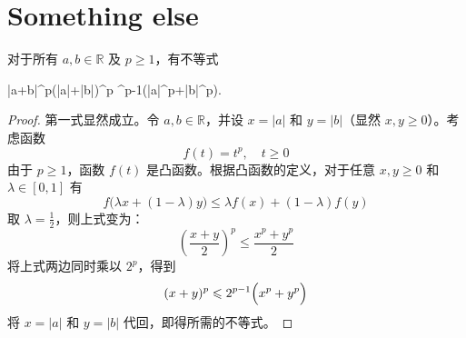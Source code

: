 \section{Something else}

\begin{theorem}
	对于所有 $a,b\in\mathbb{R}$ 及 $p\ge 1$，有不等式
	\begin{inequality*}\label{ineq:else-1}
		|a+b|^p\leqslant\Bigl(|a|+|b|\Bigr)^p ^{p-1}\Bigl(|a|^p+|b|^p\Bigr).
	\end{inequality*}
\end{theorem}
\begin{proof}
	第一式显然成立。令 $a,b\in\mathbb{R}$，并设 $x=|a|$ 和 $y=|b|$（显然 $x,y\geqslant0$）。考虑函数
	\begin{equation*}
		f(t)=t^p,\quad t\ge 0
	\end{equation*}
	由于 $p\geqslant1$，函数 $f(t)$ 是凸函数。根据凸函数的定义，对于任意 $x,y\ge 0$ 和 $\lambda\in[0,1]$ 有
	\begin{equation*}
		f\bigl(\lambda x+(1-\lambda)y\bigr)\leqslant\lambda f(x)+(1-\lambda)f(y)
	\end{equation*}
	取 $\lambda=\frac{1}{2}$，则上式变为：
	\begin{equation*}
		\left(\frac{x+y}{2}\right)^p\leqslant\frac{x^p+y^p}{2}
	\end{equation*}
	将上式两边同时乘以 $2^p$，得到
	\begin{equation*}
		(x+y)^p\leqslant2^{p-1}\Bigl(x^p+y^p\Bigr)
	\end{equation*}
	将 $x=|a|$ 和 $y=|b|$ 代回，即得所需的不等式。
\end{proof}


